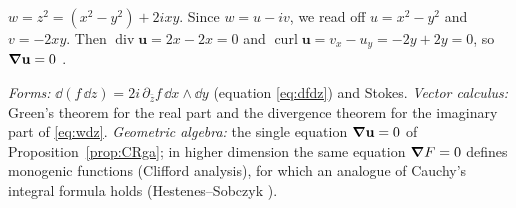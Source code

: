 \begin{example}\label{ex:monogenic}
$w=z^2=(x^2-y^2)+2ixy$. Since $w=u-iv$, we read off $u=x^2-y^2$ and $v=-2xy$. Then $\operatorname{div}\mathbf u=2x-2x=0$ and $\operatorname{curl}\mathbf u=v_x-u_y=-2y+2y=0$, so $\boldsymbol{\nabla}\mathbf u=0$ \checkmark.
\end{example}

\begin{synthesis}
\emph{Forms:} $\dd(f\,\dd z)=2i\,\partial_{\bar z}f\,\dd x\wedge\dd y$ (equation \eqref{eq:dfdz}) and Stokes. \emph{Vector calculus:} Green's theorem for the real part and the divergence theorem for the imaginary part of \eqref{eq:wdz}. \emph{Geometric algebra:} the single equation $\boldsymbol{\nabla}\mathbf u=0$ of Proposition~\ref{prop:CRga}; in higher dimension the same equation $\boldsymbol{\nabla} F=0$ defines monogenic functions (Clifford analysis), for which an analogue of Cauchy's integral formula holds (Hestenes--Sobczyk \cite{HS}).
\end{synthesis}
